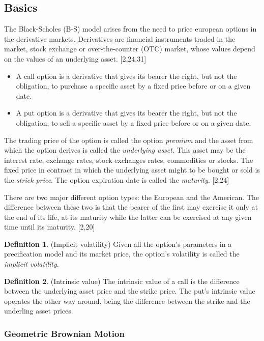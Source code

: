 \documentclass[12pt,twoside]{reedthesis}
\theoremstyle{definition}
\newtheorem{definition}{Definition}[section]
\theoremstyle{definition}
\theoremstyle{remark}
\begin{document}
  \subsection{Basics}\label{basics}
  
  The Black-Scholes (B-S) model arises from the need to price european
  options in the derivative markets. Derivatives are financial instruments
  traded in the market, stock exchange or over-the-counter (OTC) market,
  whose values depend on the values of an underlying asset. {[}2,24,31{]}
  \begin{itemize}
  \item
    A call option is a derivative that gives its bearer the right, but not
    the obligation, to purchase a specific asset by a fixed price before
    or on a given date.
  \item
    A put option is a derivative that gives its bearer the right, but not
    the obligation, to sell a specific asset by a fixed price before or on
    a given date.
  \end{itemize}
  The trading price of the option is called the option \emph{premium} and
  the asset from which the option derives is called the \emph{underlying
  asset}. This asset may be the interest rate, exchange rates, stock
  exchanges rates, commodities or stocks. The fixed price in contract in
  which the underlying asset might to be bought or sold is the
  \emph{strick price}. The option expiration date is called the
  \emph{maturity}. {[}2,24{]}
  
  There are two major different option types: the European and the
  American. The difference between these two is that the bearer of the
  first may exercise it only at the end of its life, at its maturity while
  the latter can be exercised at any given time until its maturity.
  {[}2,20{]}
  \begin{definition}{(Implicit volatility)} 
  Given all the option's parameters in a precification model and its market price, the option's volatility is called the \textit{implicit volatility}.
  \end{definition}
  \begin{definition}{(Intrinsic value)} 
  The intrinsic value of a call is the difference between the underlying asset price and the strike price. The put's intrinsic value operates the other way around, being the difference between the strike and the underling asset prices.
  \end{definition}
  \subsubsection{Geometric Brownian Motion}\label{gbm}
  
\end{document}
